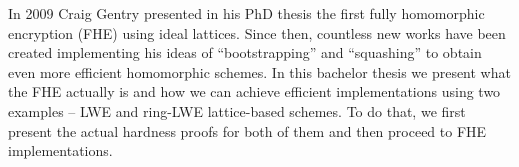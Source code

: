 In 2009 Craig Gentry presented in his PhD thesis the first fully homomorphic encryption (FHE) using ideal lattices. Since then, countless new works have been created implementing his ideas of  ``bootstrapping'' and ``squashing'' to obtain even more efficient homomorphic schemes. In this bachelor thesis we present what the FHE actually is and how we can achieve efficient implementations using two examples -- LWE and ring-LWE lattice-based schemes. To do that, we first present the actual hardness proofs for both of them and then proceed to FHE implementations.
